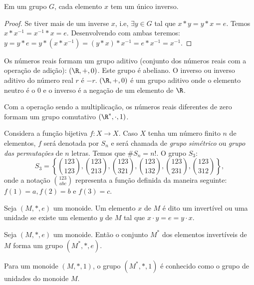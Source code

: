          \begin{stat}
            Em um grupo $G$, cada elemento $x$ tem um único inverso.
            \begin{proof}
               Se tiver mais de um inverse $x$, i.e, $\exists y \in G$ tal que $x * y = y * x = e$. Temos $x * x^{-1} = x^{-1} * x = e$. Desenvolvendo com ambas teremos: $y = y * e = y * (x * x^{-1}) = (y * x) * x^{-1} = e * x^{-1} = x^{-1}.$
            \end{proof}
         \end{stat}
         \begin{exmp}
            Os números reais formam um grupo aditivo (conjunto dos números reais com a operação de adição): $(\R,+,0)$. Este grupo é abeliano. O inverso ou inverso aditivo do número real $r$ é $-r$. $(\R,+,0)$ é um grupo aditivo onde o elemento neutro é o $0$ e o inverso é a negação de um elemento de $\R$.
         \end{exmp}
         \begin{exmp}\label{NOTR}
            Com a operação sendo a multiplicação, os números reais diferentes de zero formam um grupo comutativo $(\R^{*},\cdot , 1)$.
         \end{exmp}
         \begin{exmp}
            Considera a função bijetiva $f: X \to X$. Caso $X$ tenha um número finito $n$ de elementos, $f$ será denotada por $S_{n}$ e será chamada de \emph{grupo simétrico} ou \emph{grupo das permutações} de $n$ letras. Temos que $\#S_{n} = n!$. O grupo $S_{3}$:
            $$S_{3} = \left\{\binom{123}{123}, \binom{123}{213}, \binom{123}{321}, \binom{123}{132}, \binom{123}{231}, \binom{123}{312}  \right\},$$
            onde a notação $\binom{123}{abc}$ representa a função definida da maneira seguinte: $f(1) = a, f(2) = b$ e $f(3) = c$.
         \end{exmp}
         \begin{definition}
            Seja $(M,*,e)$ um monoide. Um elemento $x$ de $M$ é dito um invertível ou uma unidade se existe um elemento $y$ de $M$ tal que $x\cdot y = e = y\cdot x$.
         \end{definition}
         \begin{stat}
            Seja $(M,*,e)$ um monoide. Então o conjunto $M^*$ dos elementos invertíveis de $M$ forma um grupo $(M^*,*,e)$.
         \end{stat}
         \begin{definition}
            Para um monoide $(M,*,1)$, o grupo $(M^*,*,1)$ é conhecido como o grupo de unidades do monoide $M$.
         \end{definition}
